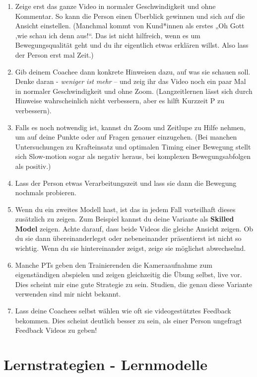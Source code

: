 \documentclass[
  letterpaper,
  DIV=11,
  numbers=noendperiod]{scrreprt}
\providecommand{\tightlist}{%
  \setlength{\itemsep}{0pt}\setlength{\parskip}{0pt}}
\begin{document}
\begin{enumerate}
\def\labelenumi{\arabic{enumi}.}
\tightlist
\item
  Zeige erst das ganze Video in normaler Geschwindigkeit und ohne
  Kommentar. So kann die Person einen Überblick gewinnen und sich auf
  die Ansicht einstellen. (Manchmal kommt von Kund*innen als erstes „Oh
  Gott ,wie schau ich denn aus!{}``. Das ist nicht hilfreich, wenn es um
  Bewegungsqualität geht und du ihr eigentlich etwas erklären willst.
  Also lass der Person erst mal Zeit.)
\item
  Gib deinem Coachee dann konkrete Hinweisen dazu, auf was sie schauen
  soll. Denke daran - \emph{weniger ist mehr} -- und zeig ihr das Video
  noch ein paar Mal in normaler Geschwindigkeit und ohne Zoom.
  (Langzeitlernen lässt sich durch Hinweise wahrscheinlich nicht
  verbessern, aber es hilft Kurzzeit P zu verbessern).
\item
  Falls es noch notwendig ist, kannst du Zoom und Zeitlupe zu Hilfe
  nehmen, um auf deine Punkte oder auf Fragen genauer einzugehen. (Bei
  manchen Untersuchungen zu Krafteinsatz und optimalen Timing einer
  Bewegung stellt sich Slow-motion sogar als negativ heraus, bei
  komplexen Bewegungsabfolgen als positiv.)
\item
  Lass der Person etwas Verarbeitungszeit und lass sie dann die Bewegung
  nochmals probieren.
\item
  Wenn du ein zweites Modell hast, ist das in jedem Fall vorteilhaft
  dieses zusätzlich zu zeigen. Zum Beispiel kannst du deine Variante als
  \textbf{Skilled Model} zeigen. Achte darauf, dass beide Videos die
  gleiche Ansicht zeigen. Ob du sie dann übereinanderlegst oder
  nebeneinander präsentierst ist nicht so wichtig. Wenn du sie
  hintereinander zeigst, zeige sie möglichst abwechselnd.
\item
  Manche PTs geben den Trainierenden die Kameraaufnahme zum
  eigenständigen abspielen und zeigen gleichzeitig die Übung selbst,
  live vor. Dies scheint mir eine gute Strategie zu sein. Studien, die
  genau diese Variante verwenden sind mir nicht bekannt.
\item
  Lass deine Coachees selbst wählen wie oft sie videogestütztes Feedback
  bekommen. Dies scheint deutlich besser zu sein, als einer Person
  ungefragt Feedback Videos zu geben!
\end{enumerate}

\section{Lernstrategien -
Lernmodelle}\label{lernstrategien---lernmodelle}
\end{document}
